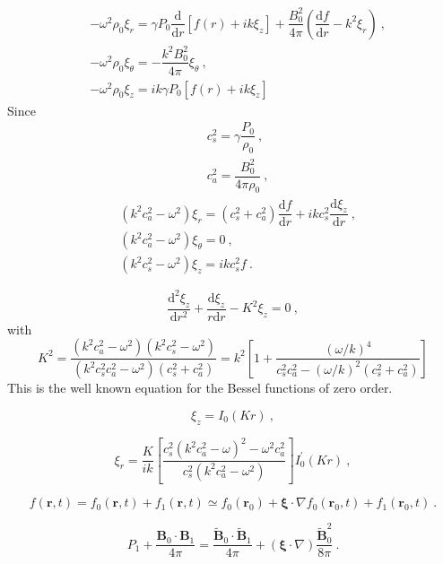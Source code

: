 \documentclass[12pt,a4paper]{article}
\renewcommand{\vec}[1]{\boldsymbol{#1}}
\newcommand{\dif}{\mathrm{d}}
\begin{document}
\begin{align*}
& -\omega^2 \rho_0 \xi_r = \gamma P_0 \dfrac{\dif }{\dif r} [f(r) +ik\xi_z] +\dfrac{B_0^2}{4\pi}  \left(\dfrac{\dif f}{\dif r} -k^2 \xi_r\right) ~, \\
& -\omega^2 \rho_0 \xi_\theta = -\dfrac{k^2 B_0^2}{4\pi} \xi_\theta ~, \\
& -\omega^2 \rho_0 \xi_z = ik\gamma P_0[f(r) +ik\xi_z]
\end{align*}
Since
\begin{align*}
& c_s^2 = \gamma \dfrac{P_0}{\rho_0} ~, \\
& c_a^2 = \dfrac{B_0^2}{4\pi \rho_0}  ~,
\end{align*}
\begin{align}
& (k^2 c_a^2 -\omega^2)\xi_r = (c_s^2 +c_a^2) \dfrac{\dif f}{\dif r} +ikc_s^2 \dfrac{\dif \xi_z}{\dif r} ~, \\
& (k^2 c_a^2 -\omega^2)\xi_\theta = 0 ~, \\
& (k^2 c_s^2 -\omega^2)\xi_z = ikc_s^2 f ~.
\end{align}

\begin{equation}
\dfrac{\dif^2 \xi_z}{\dif r^2} +\dfrac{\dif \xi_z}{r\dif r} -K^2 \xi_z = 0 ~,
\end{equation}
with
\begin{equation}
K^2 = \dfrac{(k^2 c_a^2 -\omega^2)(k^2 c_s^2 -\omega^2)}{(k^2 c_s^2 c_a^2 -\omega^2)(c_s^2 +c_a^2)} = k^2 \left[1 +\dfrac{(\omega/k)^4}{c_s^2 c_a^2 -(\omega/k)^2(c_s^2 +c_a^2)}  \right]
\end{equation}
This is the well known equation for the Bessel functions of zero order. 


\begin{equation}
\xi_z = I_0 (Kr) ~,
\end{equation}

\begin{equation*}
\xi_r = \dfrac{K}{ik} \left[\dfrac{c_s^2(k^2 c_a^2 -\omega)^2 -\omega^2 c_a^2}{c_s^2(k^2 c_a^2 -\omega^2)}  \right] I^\prime_0 (Kr) ~,
\end{equation*}

\begin{equation*}
f(\vec{r}, t) = f_0(\vec{r}, t) +f_1(\vec{r}, t) \simeq f_0(\vec{r}_0) +\vec{\xi} \cdot \nabla f_0(\vec{r}_0, t) +f_1(\vec{r}_0, t) ~.
\end{equation*}



\begin{equation*}
P_1 +\dfrac{\vec{B}_0 \cdot \vec{B}_1}{4\pi} = \dfrac{\vec{\tilde{B}}_0 \cdot \vec{\tilde{B}}_1}{4\pi} +(\vec{\xi} \cdot \nabla) \dfrac{\vec{\tilde{B}}_0^2}{8\pi} ~.
\end{equation*}
\end{document}

